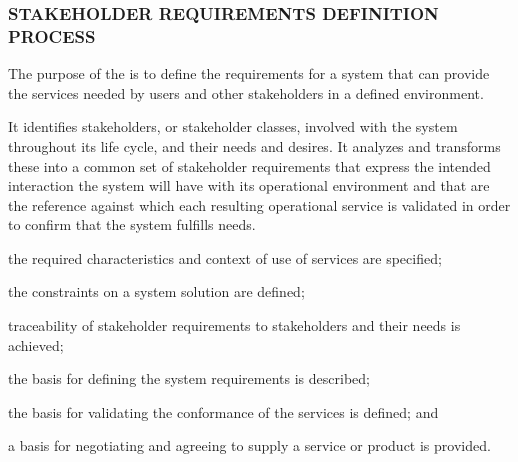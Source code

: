 		\newpage
		\subsubsection{STAKEHOLDER REQUIREMENTS DEFINITION PROCESS\label{proc:stakeholder_requirements_definition_process}}

			\begin{adjustwidth}{2em}{0pt} 
			
				The purpose of the  is to define the requirements for a system that can provide the services needed by users and other stakeholders in a defined environment.

				It identifies stakeholders, or stakeholder classes, involved with the system throughout its life cycle, and their needs and desires. It analyzes and transforms these into a common set of stakeholder requirements that express the intended interaction the system will have with its operational environment and that are the reference against which each resulting operational service is validated in order to confirm that the system fulfills needs.

			\end{adjustwidth}

			\begin{adjustwidth}{2em}{0pt} 

				\begin{compactitem}

					\item the required characteristics and context of use of services are specified;

					\item the constraints on a system solution are defined;

					\item traceability of stakeholder requirements to stakeholders and their needs is achieved;

					\item the basis for defining the system requirements is described;

					\item the basis for validating the conformance of the services is defined; and

					\item a basis for negotiating and agreeing to supply a service or product is provided.

				\end{compactitem}

			\end{adjustwidth}

